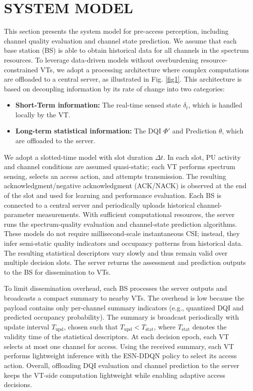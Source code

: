\documentclass[journal]{IEEEtran}
\begin{document}
\section{SYSTEM MODEL}
This section presents the system model for pre-access perception, including channel quality evaluation and channel state prediction. We assume that each base station (BS) is able to obtain historical data for all channels in the spectrum resources. To leverage data-driven models without overburdening resource-constrained VTs, we adopt a processing architecture where complex computations are offloaded to a central server, as illustrated in Fig. \ref{fig1}. This architecture is based on decoupling information by its rate of change into two categories:
\begin{itemize}
    \item \textbf{Short-Term information:} The real-time sensed state $\delta_t$, which is handled locally by the VT.
    \item \textbf{Long-term statistical information:} The DQI $\Phi'$ and Prediction $\theta$, which are offloaded to the server.
\end{itemize}
\par
We adopt a slotted-time model with slot duration $\Delta t$. In each slot, PU activity and channel conditions are assumed quasi-static; each VT performs spectrum sensing, selects an access action, and attempts transmission. The resulting acknowledgment/negative acknowledgment (ACK/NACK) is observed at the end of the slot and used for learning and performance evaluation. Each BS is connected to a central server and periodically uploads historical channel-parameter measurements. With sufficient computational resources, the server runs the spectrum-quality evaluation and channel-state prediction algorithms. These models do not require millisecond-scale instantaneous CSI; instead, they infer semi-static quality indicators and occupancy patterns from historical data. The resulting statistical descriptors vary slowly and thus remain valid over multiple decision slots. The server returns the assessment and prediction outputs to the BS for dissemination to VTs.
\par
To limit dissemination overhead, each BS processes the server outputs and broadcasts a compact summary to nearby VTs. The overhead is low because the payload contains only per-channel summary indicators (e.g., quantized DQI and predicted occupancy probability). The summary is broadcast periodically with update interval $T_{\mathrm{upd}}$, chosen such that $T_{\mathrm{upd}}<T_{\mathrm{stat}}$, where $T_{\mathrm{stat}}$ denotes the validity time of the statistical descriptors. At each decision epoch, each VT selects at most one channel for access. Using the received summary, each VT performs lightweight inference with the ESN-DDQN policy to select its access action. Overall, offloading DQI evaluation and channel prediction to the server keeps the VT-side computation lightweight while enabling adaptive access decisions.
\end{document}
